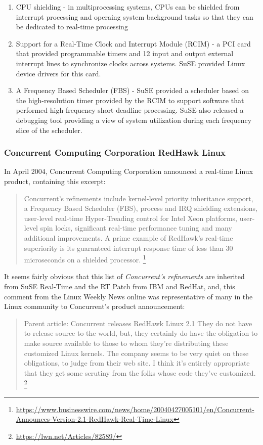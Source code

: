 \documentclass[12pt]{article}
\begin{document}
\begin{enumerate}
\item CPU shielding - in multiprocessing systems, CPUs can be shielded from
interrupt processing and operaing system background tasks so that they can be
dedicated to real-time processing
\item Support for a Real-Time Clock and Interrupt Module (RCIM) - a PCI card
that provided programmable timers and 12 input and output external interrupt
lines to synchronize clocks across systems.  SuSE provided Linux device drivers
for this card.
\item A Frequency Based Scheduler (FBS) - SuSE provided a scheduler based on
the high-resolution timer provided by the RCIM to support software that
performed high-frequency short-deadline processing.  SuSE also released a
debugging tool providing a view of system utilization during each frequency
slice of the scheduler.
\end{enumerate}
\label{ref:suse_rt_features}


\subsubsection{Concurrent Computing Corporation RedHawk Linux}

In April 2004, Concurrent Computing Corporation announced a real-time
Linux product, containing this excerpt:

\begin{quote}
Concurrent's refinements include kernel-level priority inheritance support,
a Frequency Based Scheduler (FBS), process and IRQ shielding extensions,
user-level real-time Hyper-Treading control for Intel Xeon platforms,
user-level spin locks, significant real-time performance tuning and
many additional improvements. A prime example of RedHawk's real-time
superiority is its guaranteed interrupt response time of less than
30 microseconds on a shielded
processor.%
\footnote{\url{https://www.businesswire.com/news/home/20040427005101/en/Concurrent-Announces-Version-2.1-RedHawk-Real-Time-Linux}}
\end{quote}

It seems fairly obvious that this list of \emph{Concurrent's refinements}
are inherited from SuSE Real-Time and the RT Patch from IBM and RedHat, and,
this comment from the Linux Weekly News online was representative of many in the
Linux community to Concurrent's product announcement:

\begin{quote}
Parent article: Concurrent releases RedHawk Linux 2.1
They do not have to release source to the world, but,
they certainly do have the obligation to make source
available to those to whom they're distributing these
customized Linux kernels. The company seems to be very quiet on these
obligations, to judge from their web site. I think it's entirely
appropriate that they get some scrutiny from the folks
whose code they've customized.%
\footnote{\url{https://lwn.net/Articles/82589/}}
\end{quote}
\end{document}
